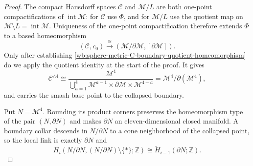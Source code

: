 \begin{proof}
The compact Hausdorff spaces \(\mathcal C\) and
\(\mathcal M/L\) are both one-point compactifications of
\(\operatorname{int}\mathcal M\): for \(\mathcal C\) use \(\Phi\), and for
\(\mathcal M/L\) use the quotient map on
\(\mathcal M\setminus L=\operatorname{int}\mathcal M\).  Uniqueness of the
one-point compactification therefore extends \(\Phi\) to a based
homeomorphism
\begin{equation}
 (\mathcal C,c_0)
 \xrightarrow{\ \cong\ }
 (\mathcal M/\partial\mathcal M,[\partial\mathcal M]).
 \label{wb:sphere-metric-C-boundary-quotient-homeomorphism}
\end{equation}
Only after establishing
\eqref{wb:sphere-metric-C-boundary-quotient-homeomorphism} do we apply the
quotient identity at the start of the proof.  It gives
\[
 \mathcal C^{\wedge4}
 \cong
 \frac{\mathcal M^4}
 {\displaystyle\bigcup_{a=1}^4
  \mathcal M^{a-1}\times\partial\mathcal M
  \times\mathcal M^{4-a}}
 =\mathcal M^4/\partial(\mathcal M^4),
\]
and carries the smash base point to the collapsed boundary.

Put \(N=\mathcal M^4\).  Rounding its product corners preserves the
homeomorphism type of the pair \((N,\partial N)\) and makes
\(\partial N\) an eleven-dimensional closed manifold.  A boundary collar
descends in \(N/\partial N\) to a cone neighborhood of the collapsed
point, so the local link is exactly \(\partial N\) and
\begin{equation}
 H_i(N/\partial N,(N/\partial N)\setminus\{*\};\mathbb Z)
 \cong\widetilde H_{i-1}(\partial N;\mathbb Z).
 \label{wb:sphere-metric-boundary-link-local-shift}
\end{equation}


\end{proof}
